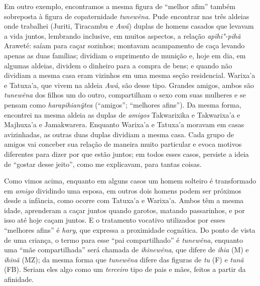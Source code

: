 Em outro exemplo, encontramos a mesma figura de ``melhor afim'' também
sobreposta à figura de copaternidade \emph{tunewẽna}. Pude encontrar nas
três aldeias onde trabalhei (Juriti, Tiracambu e \emph{Awá}) duplas de
homens casados que levavam a vida juntos, lembrando inclusive, em muitos
aspectos, a relação \emph{apĩhi"-pihã} Araweté: saíam para caçar
sozinhos; montavam acampamento de caça levando apenas as duas famílias;
dividiam o suprimento de munição e, hoje em dia, em algumas aldeias,
dividem o dinheiro para a compra de bens; e quando não dividiam a mesma
casa eram vizinhos em uma mesma seção residencial. Warixa'a e Tatuxa'a,
que vivem na aldeia \emph{Awá}, são desse tipo. Grandes amigos, ambos
são \emph{tunewẽna} dos filhos um do outro, compartilham o sexo com suas
mulheres e se pensam como \emph{harapihianỹtea} (``amigos''; ``melhores
afins''). Da mesma forma, encontrei na mesma aldeia as duplas de
\emph{amigos} Takwarixika e Takwarixa'a e Majhuxa'a e Jamakwarera.
Enquanto Warixa'a e Tatuxa'a moravam em casas avizinhadas, as outras
duas duplas dividiam a mesma casa. Cada grupo de amigos vai conceber sua
relação de maneira muito particular e evoca motivos diferentes para
dizer por que estão juntos; em todos esses casos, persiste a ideia de
``gostar desse jeito'', como me explicavam, para tantas coisas.

Como vimos acima, enquanto em alguns casos um homem solteiro é
transformado em \emph{amigo} dividindo uma esposa, em outros dois homens
podem ser próximos desde a infância, como ocorre com Tatuxa'a e
Warixa'a. Ambos têm a mesma idade, aprenderam a caçar juntos quando
garotos, matando passarinhos, e por isso até hoje caçam juntos. E o
tratamento vocativo utilizados por esses ``melhores afins'' é
\emph{hary}, que expressa a proximidade cognática. Do ponto de vista de
uma criança, o termo para esse ``pai compartilhado'' é \emph{tunewẽna},
enquanto uma ``mãe compartilhada'' será chamada de \emph{ihinewẽna}, que
difere de \emph{ihia} (M) e \emph{ihinã} (MZ); da mesma forma que
\emph{tunewẽna} difere das figuras de \emph{tu} (F) e \emph{tunã} (FB).
Seriam eles algo como um \emph{terceiro} tipo de pais e mães, feitos a
partir da afinidade.

